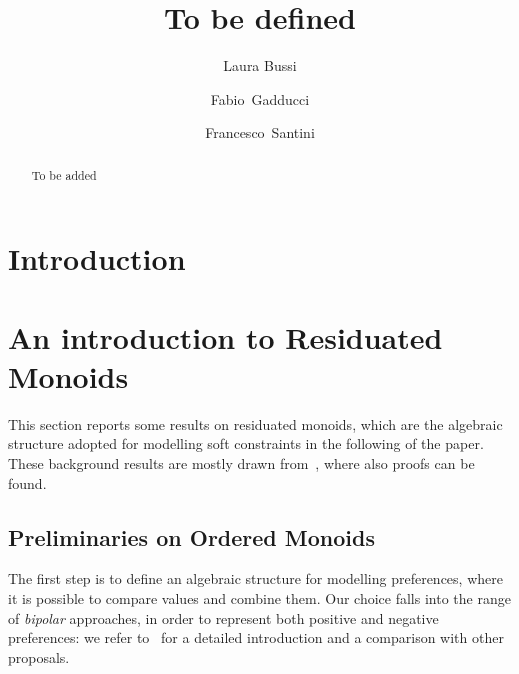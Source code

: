\documentclass[preprint,12pt]{elsarticle}
\begin{document}
\begin{frontmatter}
\title{To be defined}
    \author[lb]{Laura Bussi}
\author[fb]{Fabio~Gadducci}
    \author[fs]{Francesco~Santini}
 


\address[fb]{Dipartimento di Informatica, Universit\`a di Pisa, Italy}
\address[lb]{Dipartimento di Informatica, Universit\`a di Pisa, Italy}
\address[fs]{Dipartimento di Matematica e Informatica, Universit\`a di Perugia, Italy}


\begin{abstract}
	To be added
\end{abstract}


\end{frontmatter}



\section{Introduction}\label{sec:intro}






\section{An introduction to Residuated Monoids}\label{sec:bg}

This section reports some results on residuated monoids,
which are the algebraic structure adopted for modelling
soft constraints in the following of the paper.
These background results are mostly drawn from~\cite{jlamp17}, where also proofs can be found.


\subsection{Preliminaries on Ordered Monoids}\label{sec:lem}

The first step is to define an algebraic structure for modelling preferences,
where it is possible to compare values and combine them.
Our choice falls into the range of \emph{bipolar} approaches, in order 
to represent both positive and negative preferences: 
we refer to~\cite{ipl17} for a detailed introduction and 
a comparison with other proposals.
\end{document}
